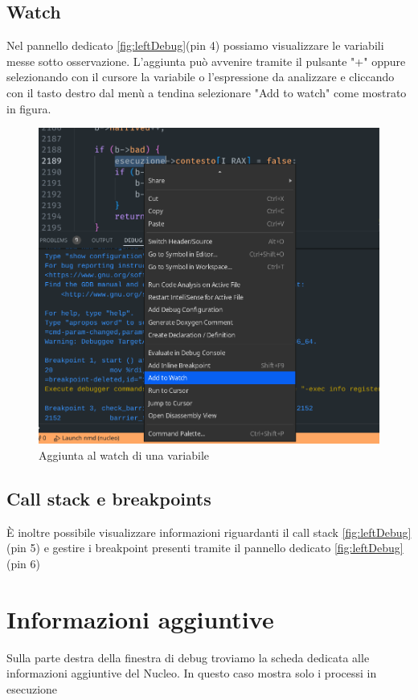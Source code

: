 \subsection*{Watch}
Nel pannello dedicato \ref*{fig:leftDebug}(pin 4) possiamo visualizzare le variabili messe sotto osservazione. L'aggiunta può avvenire tramite il pulsante "+" oppure selezionando con il cursore la variabile o l'espressione da analizzare e cliccando con il tasto destro dal menù a tendina selezionare "Add to watch" come mostrato in figura.

\begin{figure}[H]
    \centering
    \includegraphics[width=0.8\columnwidth]{images/addWatch.png}
    \caption{Aggiunta al watch di una variabile}
    \label{fig:watchvariabili}
\end{figure}

\subsection*{Call stack e breakpoints}
È inoltre possibile visualizzare informazioni riguardanti il call stack \ref*{fig:leftDebug}(pin 5) e gestire i breakpoint presenti tramite il pannello dedicato \ref*{fig:leftDebug}(pin 6)

\section{Informazioni aggiuntive}

Sulla parte destra della finestra di debug troviamo la scheda dedicata alle informazioni aggiuntive del Nucleo. In questo caso
mostra solo i processi in esecuzione 

